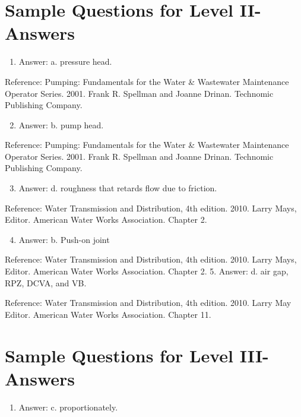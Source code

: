 \documentclass[10pt]{article}
\begin{document}
\section{Sample Questions for Level II-Answers}
\begin{enumerate}
  \item Answer: a. pressure head.
\end{enumerate}

Reference: Pumping: Fundamentals for the Water \& Wastewater Maintenance Operator Series. 2001. Frank R. Spellman and Joanne Drinan. Technomic Publishing Company.

\begin{enumerate}
  \setcounter{enumi}{1}
  \item Answer: b. pump head.
\end{enumerate}

Reference: Pumping: Fundamentals for the Water \& Wastewater Maintenance Operator Series. 2001. Frank R. Spellman and Joanne Drinan. Technomic Publishing Company.

\begin{enumerate}
  \setcounter{enumi}{2}
  \item Answer: d. roughness that retards flow due to friction.
\end{enumerate}

Reference: Water Transmission and Distribution, 4th edition. 2010. Larry Mays, Editor. American Water Works Association. Chapter 2.

\begin{enumerate}
  \setcounter{enumi}{3}
  \item Answer: b. Push-on joint
\end{enumerate}

Reference: Water Transmission and Distribution, 4th edition. 2010. Larry Mays, Editor. American Water Works Association. Chapter 2. 5. Answer: d. air gap, RPZ, DCVA, and VB.

Reference: Water Transmission and Distribution, 4th edition. 2010. Larry May Editor. American Water Works Association. Chapter 11.

\section{Sample Questions for Level III-Answers}
\begin{enumerate}
  \item Answer: c. proportionately.
\end{enumerate}
\end{document}
